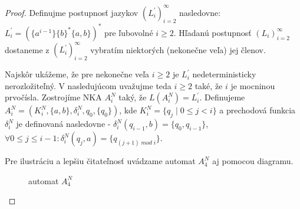 \begin{proof}
Definujme postupnosť jazykov $ (L^{\prime}_i)_{i=2}^{\infty} $ nasledovne: $ L^{\prime}_i = (\lbrace a^{i-1} \rbrace \lbrace b \rbrace^* \lbrace a,b \rbrace)^* $ pre ľubovolné $ i \geq 2 $. Hľadanú postupnosť $ (L_i)_{i=2}^{\infty} $ dostaneme z $ (L^{\prime}_i)_{i=2}^{\infty} $ vybratím niektorých (nekonečne veľa) jej členov.
\par
Najskôr ukážeme, že pre nekonečne veľa $ i \geq 2 $ je $ L^{\prime}_i $ nedeterministicky nerozložiteľný. V nasledujúcom uvažujme teda $ i \geq 2 $ také, že $ i $ je mocninou prvočísla. Zostrojíme NKA $ A_i^N $ taký, že $ L(A_i^N) = L^{\prime}_i $. Definujeme $ A_i^N = (K_i^N, \lbrace a,b \rbrace, \delta_i^N,q_0,\lbrace q_0 \rbrace) $, kde $ K_i^N = \lbrace q_j \; | \; 0 \leq j < i \rbrace $ a prechodová funkcia $ \delta_i^N $ je definovaná nasledovne - $ \delta_i^N(q_{i-1},b)=\lbrace q_0,q_{i-1} \rbrace  $, $ \forall 0 \leq j \leq i-1: \delta_i^N(q_j,a) = \lbrace q_{(j+1) \; mod \; i} \rbrace $. 

Pre ilustráciu a lepšiu čitateľnosť uvádzame automat $ A_4^N $ aj pomocou diagramu.

\begin{figure}[H]
\centering
{}
\caption{automat $ A_4^N $}
\end{figure}


\end{proof}
